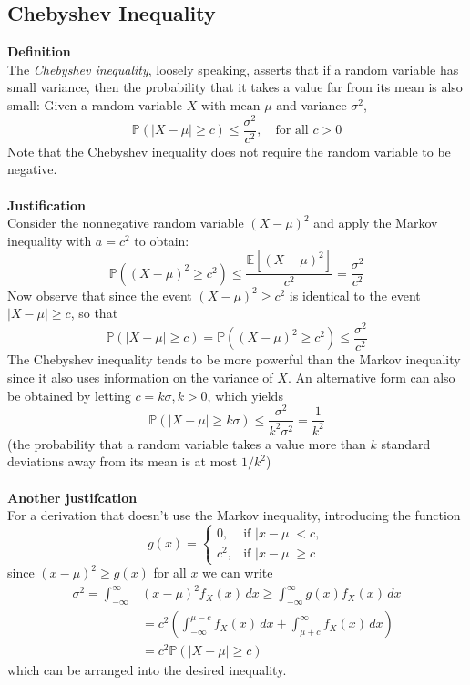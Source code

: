\documentclass{report}
\begin{document}
\subsection{Chebyshev Inequality}
\textbf{Definition}\\
The \textit{Chebyshev inequality}, loosely speaking, asserts that if a random variable has small variance, then
the probability that it takes a value far from its mean is also small: Given a random
variable $X$ with mean $\mu$ and variance $\sigma^2$,
\begin{equation*}
\boxed{\mathbb{P}(|X-\mu|\geq c)\leq\frac{\sigma^2}{c^2},\quad\text{for all $c>0$}}
\end{equation*}
Note that the Chebyshev inequality does not require the random variable to be negative.\\
\vspace{1mm}\\
\textbf{Justification}\\
Consider the nonnegative random variable $(X-\mu)^2$ and apply the Markov inequality with $a=c^2$ to obtain:
\begin{equation*}
\mathbb{P}((X-\mu)^2\geq c^2)\leq\frac{\mathbb{E}\left[(X-\mu)^2\right]}{c^2}=\frac{\sigma^2}{c^2}
\end{equation*}
Now observe that since the event $(X-\mu)^2\geq c^2$ is identical to the event $|X-\mu|\geq c$, so that
\begin{equation*}
\mathbb{P}(|X-\mu|\geq c)=\mathbb{P}((X-\mu)^2\geq c^2)\leq\frac{\sigma^2}{c^2}
\end{equation*}
The Chebyshev inequality tends to be more powerful than the Markov inequality since it also uses information on
the variance of $X$. An alternative form can also be obtained by letting $c=k\sigma, k>0$, which yields
\begin{equation*}
\mathbb{P}(|X-\mu|\geq k\sigma)\leq\frac{\sigma^2}{k^2\sigma^2}=\frac{1}{k^2}
\end{equation*}
(the probability that a random variable takes a value more than $k$ standard deviations away from its mean is at 
most $1/k^2$)\\
\vspace{1mm}\\
\textbf{Another justifcation}\\
For a derivation that doesn't use the Markov inequality, introducing the function
\begin{equation*}
g(x)=\begin{cases}
0,&\text{if }|x-\mu|<c,\\
c^2,&\text{if }|x-\mu|\geq c
\end{cases}
\end{equation*}
since $(x-\mu)^2\geq g(x)$ for all $x$ we can write
\begin{align*}
\sigma^2=\int^\infty_{-\infty}&(x-\mu)^2f_X(x)\,dx\geq
\int^\infty_{-\infty}g(x)f_X(x)\,dx\\
&=c^2\left(\int^{\mu-c}_{-\infty}f_X(x)\,dx+\int_{\mu+c}^\infty f_X(x)\,dx\right)\\
&=c^2\mathbb{P}(|X-\mu|\geq c)
\end{align*}
which can be arranged into the desired inequality.
\newpage
\end{document}
